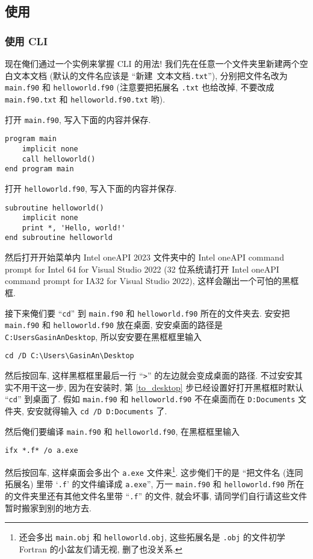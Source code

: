 \subsection{使用}\label{use_ifx}

\subsubsection{使用 CLI}

现在俺们通过一个实例来掌握 CLI 的用法! 我们先在任意一个文件夹里新建两个空白文本文档 (默认的文件名应该是 ``\textsf{新建}\texttt{\ }\textsf{文本文档}\texttt{.txt}''), 分别把文件名改为 \texttt{main.f90} 和 \texttt{helloworld.f90} (注意要把拓展名 \texttt{.txt} 也给改掉, 不要改成 \texttt{main.f90.txt} 和 \texttt{helloworld.f90.txt} 哟).

打开 \texttt{main.f90}, 写入下面的内容并保存.
\begin{lstlisting}
program main
    implicit none
    call helloworld()
end program main
\end{lstlisting}

打开 \texttt{helloworld.f90}, 写入下面的内容并保存.
\begin{lstlisting}
subroutine helloworld()
    implicit none
    print *, 'Hello, world!'
end subroutine helloworld
\end{lstlisting}

然后打开开始菜单内 Intel oneAPI 2023 文件夹中的 Intel oneAPI command prompt for Intel 64 for Visual Studio 2022 (32 位系统请打开 Intel oneAPI command prompt for IA32 for Visual Studio 2022), 这样会蹦出一个可怕的黑框框.

接下来俺们要 ``\texttt{cd}'' 到 \texttt{main.f90} 和 \texttt{helloworld.f90} 所在的文件夹去. 安安把 \texttt{main.f90} 和 \texttt{helloworld.f90} 放在桌面, 安安桌面的路径是 \texttt{C:\bs{}Users\bs{}GasinAn\bs{}Desktop}, 所以安安要在黑框框里输入
\begin{verbatim}
cd /D C:\Users\GasinAn\Desktop
\end{verbatim}
然后按回车, 这样黑框框里最后一行 ``\texttt{>}'' 的左边就会变成桌面的路径. 不过安安其实不用干这一步, 因为在安装时, 第 \ref{to_desktop} 步已经设置好打开黑框框时默认 ``\texttt{cd}'' 到桌面了. 假如 \texttt{main.f90} 和 \texttt{helloworld.f90} 不在桌面而在 \texttt{D:\bs{}Documents} 文件夹, 安安就得输入 \texttt{cd /D D:\bs{}Documents} 了.

然后俺们要编译 \texttt{main.f90} 和 \texttt{helloworld.f90}, 在黑框框里输入
\begin{verbatim}
ifx *.f* /o a.exe
\end{verbatim}
然后按回车, 这样桌面会多出个 \texttt{a.exe} 文件来\footnote{还会多出 \texttt{main.obj} 和 \texttt{helloworld.obj}, 这些拓展名是 \texttt{.obj} 的文件初学 Fortran 的小盆友们请无视, 删了也没关系.}. 这步俺们干的是 ``把文件名 (连同拓展名) 里带 `\texttt{.f}' 的文件编译成 \texttt{a.exe}'', 万一 \texttt{main.f90} 和 \texttt{helloworld.f90} 所在的文件夹里还有其他文件名里带 ``\texttt{.f}'' 的文件, 就会坏事, 请同学们自行请这些文件暂时搬家到别的地方去.

